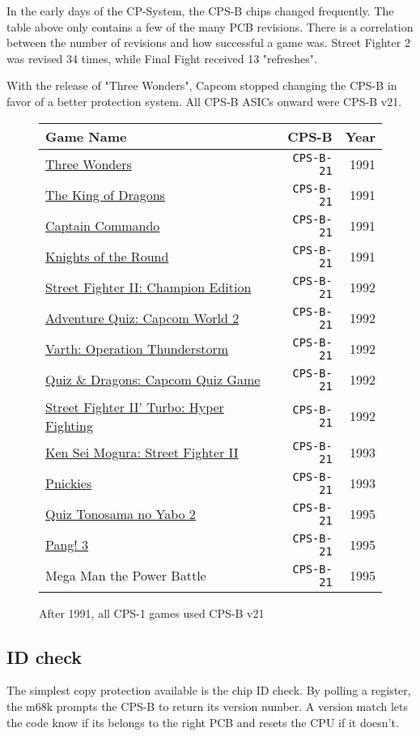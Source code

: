 In the early days of the CP-System, the CPS-B chips changed frequently. The table above only contains a few of the many PCB revisions. There is a correlation between the number of revisions and how successful a game was. Street Fighter 2 was revised 34 times, while Final Fight received 13 "refreshes".

With the release of "Three Wonders", Capcom stopped changing the CPS-B in favor of a better protection system. All CPS-B ASICs onward were CPS-B v21.

\begin{figure}[H]
{ \setlength{\tabcolsep}{3.0pt}
\begin{tabularx}{\textwidth}{Xrr} 
  \textbf{Game Name} & \textbf{ CPS-B }  & \textbf{ Year } \\               
  \toprule    
\href{}{Three Wonders} &  \texttt{CPS-B-21} & 1991 \\ 
\href{}{The King of Dragons} &  \texttt{CPS-B-21} &1991 \\ 
\href{}{Captain Commando} &  \texttt{CPS-B-21} & 1991 \\ 
\href{}{Knights of the Round} &  \texttt{CPS-B-21} &1991 \\ 
  \toprule    
\href{}{Street Fighter II: Champion Edition} &  \texttt{CPS-B-21} &1992 \\ 
\href{}{Adventure Quiz: Capcom World 2} &  \texttt{CPS-B-21} &1992 \\ 
\href{}{Varth: Operation Thunderstorm} &  \texttt{CPS-B-21} &1992 \\ 
\href{}{Quiz \& Dragons: Capcom Quiz Game} &  \texttt{CPS-B-21} &1992 \\ 
\href{}{Street Fighter II' Turbo: Hyper Fighting} &  \texttt{CPS-B-21} & 1992 \\ 
  \toprule    
\href{}{Ken Sei Mogura: Street Fighter II} &  \texttt{CPS-B-21} &1993 \\ 
\href{}{Pnickies} &  \texttt{CPS-B-21} &1993 \\ 
  \toprule    
\href{}{Quiz Tonosama no Yabo 2} &  \texttt{CPS-B-21} & 1995 \\ 
\href{}{Pang! 3} & \texttt{CPS-B-21}  & 1995 \\ 
Mega Man the Power Battle & \texttt{CPS-B-21}  & 1995 \\

\toprule    
\end{tabularx}%
}\caption*{After 1991, all CPS-1 games used CPS-B v21}
\end{figure}


\subsection{ID check}
The simplest copy protection available is the chip ID check. By polling a register, the m68k prompts the CPS-B to return its version number. A version match lets the code know if its belongs to the right PCB and resets the CPU if it doesn't. 

